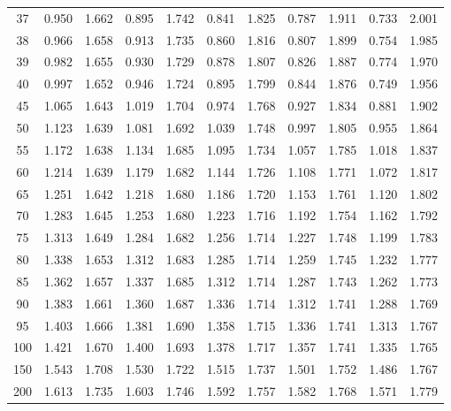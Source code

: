 \documentclass[12pt]{article}
\begin{document}
\begin{table}
\begin{center}
{\begin{tabular}{|c|c|c|c|c|c|c|c|c|c|c|}
37&0.950&1.662&0.895&1.742&0.841&1.825&0.787&1.911&0.733&
2.001\\


38&
0.966&1.658&0.913&1.735&0.860&1.816&0.807&1.899&0.754&1.985\\


39&0.982&1.655&
0.930&1.729&0.878&1.807&0.826&1.887&0.774&1.970\\


40&0.997&1.652&0.946&1.724&
0.895&1.799&0.844&1.876&0.749&1.956\\


45&1.065&1.643&1.019&1.704&0.974&1.768&
0.927&1.834&0.881&1.902\\


50&1.123&1.639&1.081&1.692&1.039&1.748&0.997&1.805&
0.955&1.864\\


55&1.172&1.638&1.134&1.685&1.095&1.734&1.057&1.785&1.018&1.837\\


60&1.214&
1.639&1.179&1.682&1.144&1.726&1.108&1.771&1.072&1.817\\


65&1.251&1.642&1.218&
1.680&1.186&1.720&1.153&1.761&1.120&1.802\\


70&1.283&1.645&1.253&1.680&1.223&
1.716&1.192&1.754&1.162&1.792\\


75&1.313&1.649&1.284&1.682&1.256&1.714&1.227&
1.748&1.199&1.783\\


80&1.338&1.653&1.312&1.683&1.285&1.714&1.259&1.745&1.232&
1.777\\


85&
1.362&1.657&1.337&1.685&1.312&1.714&1.287&1.743&1.262&1.773\\


90&1.383&1.661&
1.360&1.687&1.336&1.714&1.312&1.741&1.288&1.769\\

 95&1.403&1.666&1.381&1.690&
1.358&1.715&1.336&1.741&1.313&1.767\\


100&1.421&1.670&1.400&1.693&1.378&
1.717&1.357&1.741&1.335&1.765\\


150&1.543&1.708&1.530&1.722&1.515&1.737&
1.501&1.752&1.486&1.767\\


200&1.613&1.735 &1.603&1.746&1.592&1.757 &1.582& 1.768&1.571&1.779\\
  \hline
\end{tabular}
}
\end{center}
\end{table}
\end{document}

